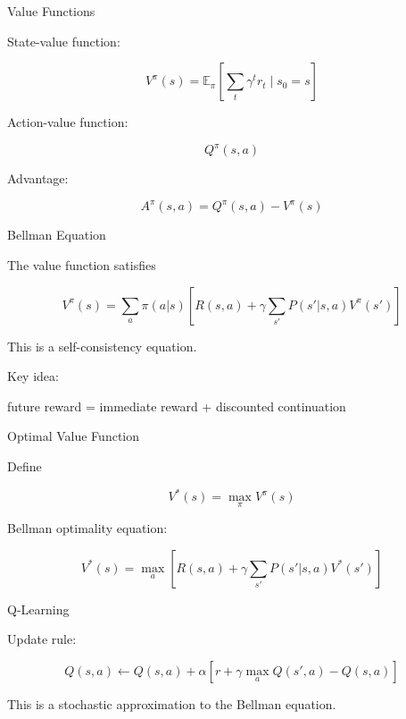 \documentclass{beamer}
\begin{document}
\begin{frame}{Value Functions}

  State-value function:

  \[
  V^\pi(s) = \mathbb{E}_\pi\left[\sum_t \gamma^t r_t \mid s_0=s\right]
  \]

  Action-value function:

  \[
  Q^\pi(s,a)
  \]

  Advantage:

  \[
  A^\pi(s,a) = Q^\pi(s,a) - V^\pi(s)
  \]

\end{frame}

\begin{frame}{Bellman Equation}

  The value function satisfies

  \[
  V^\pi(s) =
  \sum_a \pi(a|s)\left[
    R(s,a) + \gamma \sum_{s'} P(s'|s,a)V^\pi(s')
    \right]
  \]

  This is a self-consistency equation.

  Key idea:

  \begin{center}
    future reward = immediate reward + discounted continuation
  \end{center}

\end{frame}

\begin{frame}{Optimal Value Function}

  Define

  \[
  V^*(s) = \max_\pi V^\pi(s)
  \]

  Bellman optimality equation:

  \[
  V^*(s) = \max_a \left[
    R(s,a) + \gamma \sum_{s'} P(s'|s,a)V^*(s')
    \right]
  \]

\end{frame}

\begin{frame}{Q-Learning}

  Update rule:

  \[
  Q(s,a) \leftarrow Q(s,a) +
  \alpha \left[r + \gamma \max_a Q(s',a) - Q(s,a)\right]
  \]

  This is a stochastic approximation to the Bellman equation.

\end{frame}
\end{document}
